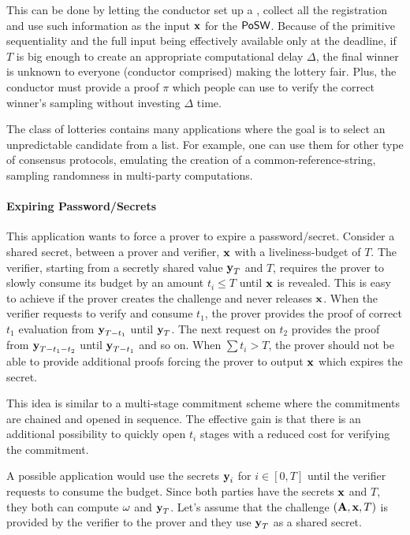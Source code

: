 This can be done by letting the conductor set up a \PoSW, collect all the registration and use
such information as the input $\vx$ for the $\textsf{PoSW}$.
Because of the primitive sequentiality and the full input being effectively available only
at the deadline,
if $T$ is big enough to create an appropriate computational delay $\Delta$, the final winner is
unknown to everyone (conductor comprised) making the lottery fair.
Plus, the conductor must provide a proof $\pi$ which people can use to verify the
correct winner's sampling without investing $\Delta$ time.

The class of lotteries contains many applications where the goal is to select an unpredictable
candidate from a list.
For example, one can use them for other type of consensus protocols, emulating the creation
of a common-reference-string, sampling randomness in multi-party computations.
	


\paragraph{Expiring Password/Secrets}
	
This application wants to force a prover to expire a password/secret.
Consider a shared secret, between a prover and verifier, $\vx$ with a liveliness-budget of $T$.
The verifier, starting from a secretly shared value $\vy[T]$ and $T$, requires the prover to slowly
consume its budget by an amount $t_i \leq T$ until $\vx$ is revealed.
%
This is easy to achieve if the prover creates the challenge and never releases $\vx$.
When the verifier requests to verify and consume $t_1$, the prover provides the proof
of correct $t_1$ evaluation from $\vy[T-t_1]$ until $\vy[T]$.
The next request on $t_2$ provides the proof from $\vy[T-t_1-t_2]$ until $\vy[T-t_1]$ and so on.
When $\sum t_i > T$, the prover should not be able to provide additional proofs forcing the
prover to output $\vx$ which expires the secret.

This idea is similar to a multi-stage commitment scheme where the commitments are chained and
opened in sequence.
The effective gain is that there is an additional possibility to quickly open $t_i$ stages
with a reduced cost for verifying the commitment.


\vspace{3mm}
A possible application would use the secrets $\vy[i]$ for $i\in[0,T]$ until the verifier
requests to consume the budget.
Since both parties have the secrets $\vx$ and $T$, they both can compute $\witness$ and $\vy[T]$.
Let's assume that the challenge $(\vA,\vx,T)$ is provided by the verifier to the prover
and they use $\vy[T]$ as a shared secret.


